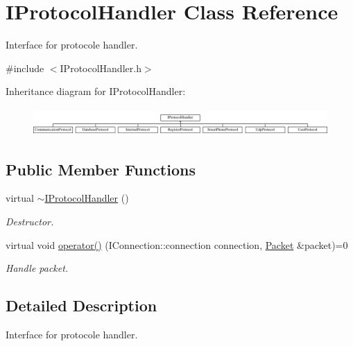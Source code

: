 \hypertarget{class_i_protocol_handler}{\section{I\-Protocol\-Handler Class Reference}
\label{class_i_protocol_handler}
}


Interface for protocole handler.  




{\ttfamily \#include $<$I\-Protocol\-Handler.\-h$>$}

Inheritance diagram for I\-Protocol\-Handler\-:\begin{figure}[H]
\begin{center}
\leavevmode
\includegraphics[height=1.052632cm]{class_i_protocol_handler}
\end{center}
\end{figure}
\subsection*{Public Member Functions}
\begin{DoxyCompactItemize}
\item 
\hypertarget{class_i_protocol_handler_a216ce6786694b00a901f2f9fc234f261}{virtual \hyperlink{class_i_protocol_handler_a216ce6786694b00a901f2f9fc234f261}{$\sim$\-I\-Protocol\-Handler} ()}\label{class_i_protocol_handler_a216ce6786694b00a901f2f9fc234f261}

\begin{DoxyCompactList}\small\item\em Destructor. \end{DoxyCompactList}\item 
virtual void \hyperlink{class_i_protocol_handler_abcdcfa563b512a954b08bee298e6e1ed}{operator()} (I\-Connection\-::connection connection, \hyperlink{class_packet}{Packet} \&packet)=0
\begin{DoxyCompactList}\small\item\em Handle packet. \end{DoxyCompactList}\end{DoxyCompactItemize}


\subsection{Detailed Description}
Interface for protocole handler. 

